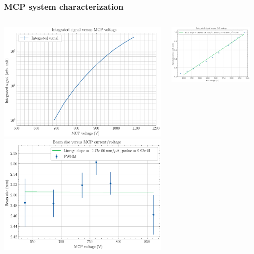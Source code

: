 \begin{frame}
  \frametitle{MCP system characterization}
  \begin{columns}[T]
    \begin{column}{0.45\textwidth}
          \includegraphics[width=1\textwidth]{04_Test/fig/fig000_MCP_gain_a}
          \includegraphics[width=1\textwidth]{04_Test/fig/fig000_MCP_gain_b}
    \end{column}
    \begin{column}{0.45\textwidth}
      \includegraphics[width=1\textwidth]{04_Test/fig/fig000_P43_gain}

\end{column}
\end{columns}
\end{frame}
